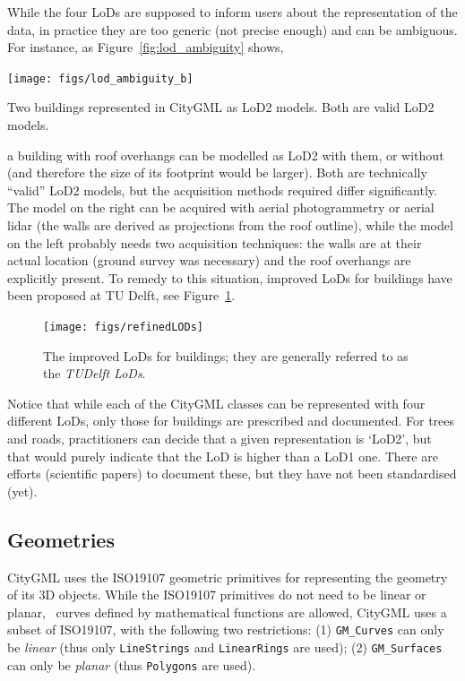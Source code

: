 While the four LoDs are supposed to inform users about the representation of the data, in practice they are too generic (not precise enough) and can be ambiguous. 
For instance, as Figure~\ref{fig:lod_ambiguity} shows,
\begin{marginfigure}
  \centering
  \texttt{[image: figs/lod\_ambiguity\_b]}
  \caption[Two buildings represented in CityGML as LoD2 models]{Two buildings represented in CityGML as LoD2 models. Both are valid LoD2 models.}%
\label{fig:lod_ambiguity}
\end{marginfigure}
a building with roof overhangs can be modelled as LoD2 with them, or without (and therefore the size of its footprint would be larger).
Both are technically ``valid'' LoD2 models, but the acquisition methods required differ significantly.
The model on the right can be acquired with aerial photogrammetry or aerial lidar (the walls are derived as projections from the roof outline), while the model on the left probably needs two acquisition techniques: the walls are at their actual location (ground survey was necessary) and the roof overhangs are explicitly present.
To remedy to this situation, improved LoDs for buildings have been proposed at TU Delft, see Figure~\ref{fig:refinedLODs}.
\begin{figure}
  \centering
  \texttt{[image: figs/refinedLODs]}
  \caption[The TUDelft LoDs]{The improved LoDs for buildings; they are generally referred to as the \emph{TUDelft LoDs}.}%
\label{fig:refinedLODs}
\end{figure}

%

Notice that while each of the CityGML classes can be represented with four different LoDs, only those for buildings are prescribed and documented.
For trees and roads, practitioners can decide that a given representation is `LoD2', 
but that would purely indicate that the LoD is higher than a LoD1 one.
There are efforts (scientific papers) to document these, but they have not been standardised (yet).


\subsection{Geometries}

CityGML uses the ISO19107 geometric primitives for representing the geometry of its 3D objects.
While the ISO19107 primitives do not need to be linear or planar, \ie\ curves defined by mathematical functions are allowed, CityGML uses a subset of ISO19107, with the following two restrictions: (1) \texttt{GM\_Curves} can only be \emph{linear} (thus only \texttt{LineStrings} and \texttt{LinearRings} are used); (2) \texttt{GM\_Surfaces} can only be \emph{planar} (thus \texttt{Polygons} are used).

